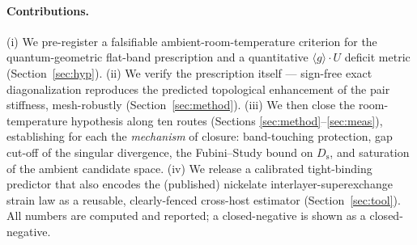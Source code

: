 \documentclass[11pt,a4paper]{article}
\newcommand{\qgg}{\langle g \rangle}
\newcommand{\Ds}{D_{\mathrm{s}}}
\begin{document}
\paragraph{Contributions.}
(i) We pre-register a falsifiable ambient-room-temperature criterion for the quantum-geometric
flat-band prescription and a quantitative $\qgg\!\cdot\!U$ deficit metric (Section~\ref{sec:hyp}).
(ii) We verify the prescription itself --- sign-free exact diagonalization reproduces the
predicted topological enhancement of the pair stiffness, mesh-robustly (Section~\ref{sec:method}).
(iii) We then close the room-temperature hypothesis along ten routes (Sections
\ref{sec:method}--\ref{sec:meas}), establishing for each the \emph{mechanism} of closure:
band-touching protection, gap cut-off of the singular divergence, the Fubini--Study bound on $\Ds$,
and saturation of the ambient candidate space.
(iv) We release a calibrated tight-binding predictor that also encodes the (published) nickelate
interlayer-superexchange strain law as a reusable, clearly-fenced cross-host estimator
(Section~\ref{sec:tool}).
All numbers are computed and reported; a closed-negative is shown as a closed-negative.
\end{document}
